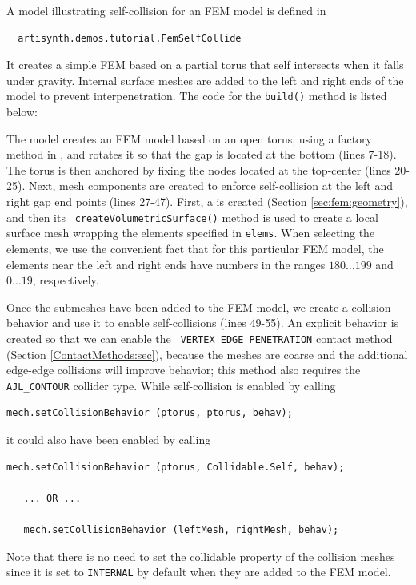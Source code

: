 A model illustrating self-collision for an FEM model is defined in
%
\begin{verbatim}
  artisynth.demos.tutorial.FemSelfCollide
\end{verbatim}
%
It creates a simple FEM based on a partial torus that self intersects
when it falls under gravity. Internal surface meshes are added to the
left and right ends of the model to prevent interpenetration.
The code for the {\tt build()} method is listed below:
%
\lstset{numbers=left} 
\iflatexml

\else

\fi
\lstset{numbers=none}

The model creates an FEM model based on an open torus, using a factory
method in , and
rotates it so that the gap is located at the bottom (lines 7-18).  The
torus is then anchored by fixing the nodes located at the top-center
(lines 20-25). Next, mesh components are created to enforce
self-collision at the left and right gap end points (lines 27-47).
First, a  is created
(Section \ref{sec:fem:geometry}), and then its {\tt
createVolumetricSurface()} method is used to create a local surface
mesh wrapping the elements specified in {\tt elems}. When selecting
the elements, we use the convenient fact that for this particular FEM
model, the elements near the left and right ends have numbers in the
ranges $180 \ldots 199$ and $0 \ldots 19$, respectively.

Once the submeshes have been added to the FEM model, we create a
collision behavior and use it to enable self-collisions (lines
49-55). An explicit behavior is created so that we can enable the {\tt
VERTEX\_EDGE\_PENETRATION} contact method (Section
\ref{ContactMethods:sec}), because the meshes are coarse and the
additional edge-edge collisions will improve behavior; this method also
requires the {\tt AJL\_CONTOUR} collider type. While self-collision is
enabled by calling
%
\begin{lstlisting}[]
   mech.setCollisionBehavior (ptorus, ptorus, behav);
\end{lstlisting}
%
it could also have been enabled by calling
%
\begin{lstlisting}[]
   mech.setCollisionBehavior (ptorus, Collidable.Self, behav);

   ... OR ...

   mech.setCollisionBehavior (leftMesh, rightMesh, behav);
\end{lstlisting}
%
Note that there is no need to set the {\sf collidable} property of the
collision meshes since it is set to {\tt INTERNAL} by default when
they are added to the FEM model.

